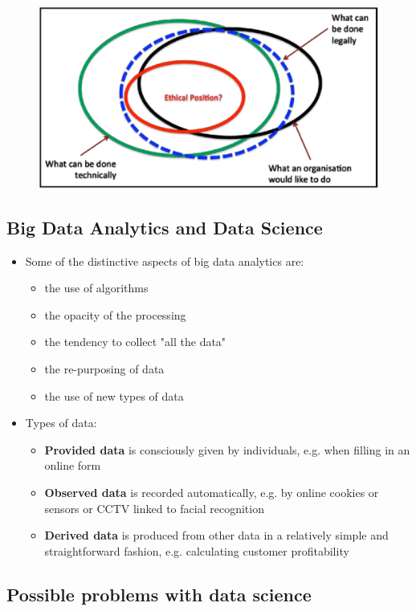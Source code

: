 \documentclass[a4paper]{article}
\begin{document}
		\begin{figure}[htb!]
			\centering
			\includegraphics[width=.5\textwidth]{img/sw11/ethical_position.png}
		\end{figure}
	
		\subsection{Big Data Analytics and Data Science}
	
		\begin{itemize}
			\item Some of the distinctive aspects of big data analytics are:
				\begin{itemize}
					\item the use of algorithms
					\item the opacity of the processing
					\item the tendency to collect "all the data"
					\item the re-purposing of data
					\item the use of new types of data
				\end{itemize}
			\item Types of data:
				\begin{itemize}
					\item \textbf{Provided data} is consciously given by individuals, e.g. when filling in an online form
					\item \textbf{Observed data} is recorded automatically, e.g. by online cookies or sensors or CCTV linked to facial recognition
					\item \textbf{Derived data} is produced from other data in a relatively simple and straightforward fashion, e.g. calculating customer profitability
				\end{itemize}
		\end{itemize}
	
		\subsection{Possible problems with data science}
		
\end{document}

